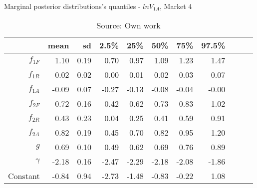 \begin{table}[H]
\caption{Marginal posterior distributions's quantiles - $ln V_{1A}$,  Market 4}
\centering
\begin{tabular}{rrrrrrrrrrr}
  \toprule
           & mean  & sd & 2.5\%   & 25\%  & 50\%  & 75\%  & 97.5\%\\ 
  \hline
  $f_{1F}$ & 1.10  & 0.19 & 0.70  & 0.97  & 1.09  & 1.23  & 1.47  \\ 
  $f_{1R}$ & 0.02  & 0.02 & 0.00  & 0.01  & 0.02  & 0.03  & 0.07  \\ 
  $f_{1A}$ & -0.09 & 0.07 & -0.27 & -0.13 & -0.08 & -0.04 & -0.00 \\ 
  $f_{2F}$ & 0.72  & 0.16 & 0.42  & 0.62  & 0.73  & 0.83  & 1.02  \\ 
  $f_{2R}$ & 0.43  & 0.23 & 0.04  & 0.25  & 0.41  & 0.59  & 0.91  \\ 
  $f_{2A}$ & 0.82  & 0.19 & 0.45  & 0.70  & 0.82  & 0.95  & 1.20  \\ 
  $g$      & 0.69  & 0.10 & 0.49  & 0.62  & 0.69  & 0.76  & 0.89  \\ 
  $\gamma$ & -2.18 & 0.16 & -2.47 & -2.29 & -2.18 & -2.08 & -1.86 \\ 
  Constant & -0.84 & 0.94 & -2.73 & -1.48 & -0.83 & -0.22 & 1.08  \\ 
     \bottomrule
\end{tabular}
\caption*{Source: Own work}
\end{table}
